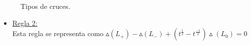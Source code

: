 \documentclass[14pt]{extarticle}
\begin{document}
   \begin{figure}[h!]
   	\centering
   	\caption{Tipos de cruces.}
   	\label{alex1} 
   \end{figure}


\begin{itemize}
	\item \underline{Regla 2:} \\
	 Esta regla se representa como $\vartriangle(L_{+}) - \vartriangle(L_{-}) +  (t^{\frac{1}{2}} - t^{\frac{-1}{2}}) \vartriangle(L_{0})  = 0$
\end{itemize}
\end{document}
